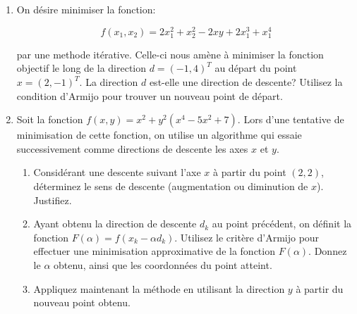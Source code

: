 \begin{enumerate}
    \begin{solution}
    \end{solution}

  \item On d\'esire minimiser la fonction:

    $$
    f(x_1, x_2)=2x_1^2 + x_2^2 - 2xy + 2x_1^3 + x_1^4
    $$

    par une methode it\'erative. Celle-ci nous am\`ene \`a minimiser
    la fonction objectif le long de la direction $d = (-1, 4)^T$ au
    d\'epart du point $x=(2,-1)^T$. La direction $d$ est-elle une
    direction de descente? Utilisez la condition d'Armijo pour trouver
    un nouveau point de d\'epart.


%


    \begin{solution}
    \end{solution}

  \item Soit la fonction $f(x,y)=x^2+y^2(x^4-5x^2+7)$. Lors d'une
    tentative de minimisation de cette fonction, on utilise un
    algorithme qui essaie successivement comme directions de descente
    les axes $x$ et $y$.
    \begin{enumerate}
      \item Considérant une descente suivant l'axe $x$ à partir du point
        $(2,2)$, déterminez le sens de descente (augmentation ou
        diminution de $x$). Justifiez.
      \item Ayant obtenu la direction de
        descente $d_k$ au point précédent, on définit la fonction
        $F(\alpha)=f(x_k-\alpha d_k)$. Utilisez le critère d'Armijo pour
        effectuer une minimisation approximative de la fonction
        $F(\alpha)$. Donnez le $\alpha$ obtenu, ainsi que les coordonnées
        du point atteint.
      \item Appliquez maintenant la méthode en utilisant
        la direction $y$ à partir du nouveau point obtenu.
    \end{enumerate}







\end{enumerate}

